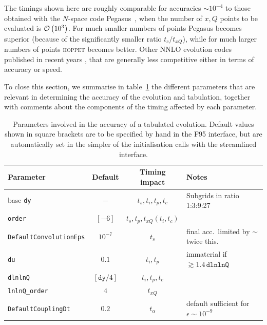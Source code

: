 \documentclass[12pt]{article}
\newcommand{\comment}[1]{\textbf{[#1]}}
\newcommand{\hoppet}{\textsc{hoppet}\xspace}
\newcommand{\ttt}[1]{\texttt{#1}}
\newcommand{\order}[1]{{\cal O}\left(#1\right)}
\begin{document}
The timings shown here are roughly comparable for accuracies $\sim
10^{-4}$ to those obtained with the $N$-space code
Pegasus~\cite{Pegasus}, when the number of $x,Q$ points to be
evaluated is $\order{10^3}$. For much smaller numbers of points
Pegasus becomes superior (because of the significantly smaller ratio
$t_c/t_{xQ}$), while for much larger numbers of points \hoppet becomes
better. Other NNLO evolution codes published in recent years 
\cite{Weinzierl:2002mv,coriano,Botje}, that
 are generally less competitive
either in terms of accuracy or speed.

To close this section, we summarise in table~\ref{tab:acc-param} the
different parameters that are relevant in determining the accuracy of
the evolution and tabulation, together with comments about the
components of the timing affected by each parameter.


\begin{table}
  \centering
  \begin{tabular}{|l|c|c|l|} \hline
    Parameter & Default & Timing impact & Notes \\ \hline
    base \ttt{dy}  &  $-$    &   $t_s, t_i, t_p, t_c$    & Subgrids
    in ratio 1:3:9:27 \\
    \ttt{order} &  $[-6]$    &   $t_s, t_p, t_{xQ} (t_i, t_c)$ & \\ 
    \ttt{DefaultConvolutionEps} & $10^{-7}$ & $t_s$ & final acc.\
    limited by $\sim$ twice this.\\ \hline
    \ttt{du}  &  $0.1$ &  $t_i, t_p$ & immaterial if $\gtrsim 1.4\,
    \ttt{dlnlnQ}$\\
    \ttt{dlnlnQ}       &  $[\ttt{dy}/4] $ &  $t_i, t_p, t_c$ &  \\
    \ttt{lnlnQ\_order} &  $4$ &  $t_{xQ}$ &  \\ \hline
    \ttt{DefaultCouplingDt} & $0.2$ & $t_\alpha$ & default sufficient for 
$\epsilon \sim 10^{-9}$\\
    \hline
  \end{tabular}
  \caption{Parameters involved in the accuracy
of a tabulated evolution. Default values shown in square
    brackets are to be specified by hand in the F95 interface, but are
    automatically set in the simpler of the initialisation calls with
    the streamlined interface.} 
  \label{tab:acc-param}
\end{table}
\end{document}
